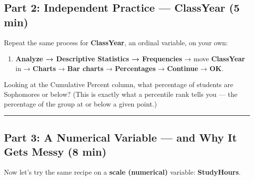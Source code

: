 \documentclass[
  11pt,
]{article}
\providecommand{\tightlist}{%
  \setlength{\itemsep}{0pt}\setlength{\parskip}{0pt}}\usepackage{longtable,booktabs,array}
\begin{document}
\subsection{Part 2: Independent Practice --- ClassYear (5
min)}\label{part-2-independent-practice-classyear-5-min}

Repeat the same process for \textbf{ClassYear}, an ordinal variable, on
your own:

\begin{enumerate}
\def\labelenumi{\arabic{enumi}.}
\tightlist
\item
  \textbf{Analyze → Descriptive Statistics → Frequencies} → move
  \textbf{ClassYear} in → \textbf{Charts} → \textbf{Bar charts} →
  \textbf{Percentages} → \textbf{Continue} → \textbf{OK}.
\end{enumerate}

\begin{tcolorbox}[enhanced jigsaw, toptitle=1mm, colbacktitle=quarto-callout-tip-color!10!white, bottomtitle=1mm, arc=.35mm, colback=white, leftrule=.75mm, toprule=.15mm, left=2mm, opacityback=0, coltitle=black, colframe=quarto-callout-tip-color-frame, titlerule=0mm, title=\textcolor{quarto-callout-tip-color}{\faLightbulb}\hspace{0.5em}{Checkpoint}, breakable, rightrule=.15mm, opacitybacktitle=0.6, bottomrule=.15mm]

Looking at the Cumulative Percent column, what percentage of students
are Sophomores or below? (This is exactly what a percentile rank tells
you --- the percentage of the group at or below a given point.)

\end{tcolorbox}

\begin{center}\rule{0.5\linewidth}{0.5pt}\end{center}

\subsection{Part 3: A Numerical Variable --- and Why It Gets Messy (8
min)}\label{part-3-a-numerical-variable-and-why-it-gets-messy-8-min}

Now let's try the same recipe on a \textbf{scale (numerical)} variable:
\textbf{StudyHours}.
\end{document}

